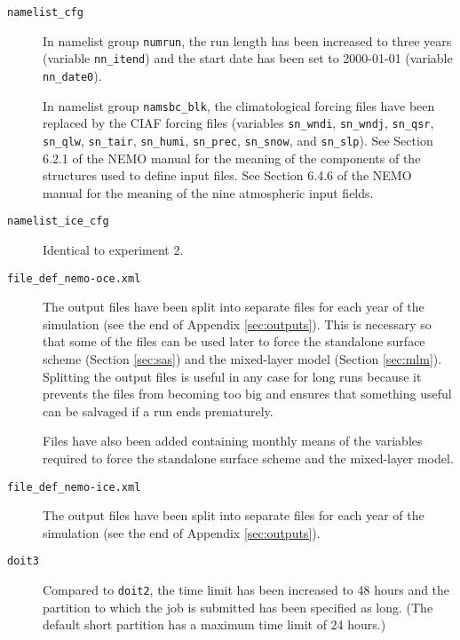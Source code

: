 \begin{description}

    \item[\texttt{namelist\_cfg}]
        In namelist group \verb|numrun|, the run length has been increased to three years (variable \verb|nn_itend|) and the start date has been set to 2000-01-01 (variable \verb|nn_date0|).

        In namelist group \verb|namsbc_blk|, the climatological forcing files have been replaced by the CIAF forcing files (variables \verb|sn_wndi|, \verb|sn_wndj|, \verb|sn_qsr|, \verb|sn_qlw|, \verb|sn_tair|, \verb|sn_humi|, \verb|sn_prec|, \verb|sn_snow|, and \verb|sn_slp|).
        See Section 6.2.1 of the NEMO manual for the meaning of the components of the structures used to define input files.
        See Section 6.4.6 of the NEMO manual for the meaning of the nine atmospheric input fields.

    \item[\texttt{namelist\_ice\_cfg}]
        Identical to experiment 2.

    \item[\texttt{file\_def\_nemo-oce.xml}]
        The output files have been split into separate files for each year of the simulation (see the end of Appendix \ref{sec:outputs}).
        This is necessary so that some of the files can be used later to force the standalone surface scheme (Section \ref{sec:sas}) and the mixed-layer model (Section \ref{sec:mlm}).
        Splitting the output files is useful in any case for long runs because it prevents the files from becoming too big and ensures that something useful can be salvaged if a run ends prematurely.

        Files have also been added containing monthly means of the variables required to force the standalone surface scheme and the mixed-layer model.

    \item[\texttt{file\_def\_nemo-ice.xml}]
        The output files have been split into separate files for each year of the simulation (see the end of Appendix \ref{sec:outputs}).

    \item[\texttt{doit3}]
        Compared to \verb|doit2|, the time limit has been increased to 48 hours and the partition to which the job is submitted has been specified as long.
        (The default short partition has a maximum time limit of 24 hours.)

\end{description}

